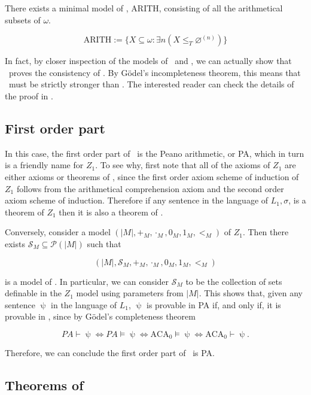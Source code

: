 \documentclass[../main.tex]{memoir}
\begin{document}
\begin{corollary}
  \label{corollary:arith-model}
  There exists a minimal model of \aca, ARITH, consisting of all the arithmetical subsets of $\omega$.

  \[ \text{ARITH} := \{X \subseteq \omega: \exists n (X \le_T \varnothing^{(n)})\} \]
\end{corollary}

In fact, by closer inspection of the models of \aca\ and \wkl, we can actually show that \aca\ proves the consistency of \wkl. By Gödel's incompleteness theorem, this means that \aca\ must be strictly stronger than \wkl. The interested reader can check the details of the proof in \cite{simpson}.

\subsection{First order part}

In this case, the first order part of \aca\ is the Peano arithmetic, or PA, which in turn is a friendly name for $Z_1$. To see why, first note that all of the axioms of $Z_1$ are either axioms or theorems of \aca, since the first order axiom scheme of induction of $Z_1$ follows from the arithmetical comprehension axiom and the second order axiom scheme of induction. Therefore if any sentence in the language of $L_1, \sigma$, is a theorem of $Z_1$ then it is also a theorem of \aca.

Conversely, consider a model $(|M|, +_M, \cdot_M, 0_M, 1_M, <_M)$ of $Z_1$. Then there exists $\mathcal{S}_M \subseteq \mathcal{P}(|M|)$ such that

\[ (|M|, \mathcal{S}_M, +_M, \cdot_M, 0_M, 1_M, <_M) \]

is a model of \aca. In particular, we can consider $\mathcal{S}_M$ to be the collection of sets definable in the $Z_1$ model using parameters from $|M|$. This shows that, given any sentence $\uppsi$ in the language of $L_1$, $\uppsi$ is provable in PA if, and only if, it is provable in \aca, since by Gödel's completeness theorem

\[ PA \vdash \uppsi \iff PA \vDash \uppsi \iff \text{ACA}_0 \vDash \uppsi \iff \text{ACA}_0 \vdash \uppsi. \]

Therefore, we can conclude the first order part of \aca\ is PA.

\subsection{Theorems of \aca}
\end{document}
